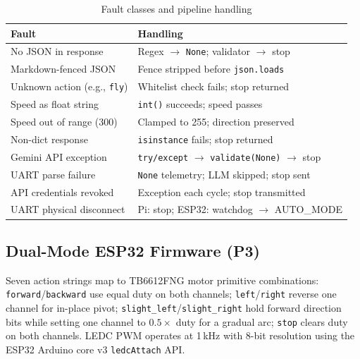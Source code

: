 \documentclass[conference]{IEEEtran}
\begin{document}
\begin{table}[t]
\caption{Fault classes and pipeline handling}
\label{tab:faults}
\centering
\renewcommand{\arraystretch}{1.05}
\begin{tabular}{@{}p{2.5cm}p{4.9cm}@{}}
\toprule
\textbf{Fault} & \textbf{Handling} \\
\midrule
No JSON in response       & Regex $\to$ \texttt{None}; validator $\to$ stop \\
Markdown-fenced JSON      & Fence stripped before \texttt{json.loads} \\
Unknown action (e.g., \texttt{fly}) & Whitelist check fails; stop returned \\
Speed as float string     & \texttt{int()} succeeds; speed passes \\
Speed out of range (300)  & Clamped to 255; direction preserved \\
Non-dict response         & \texttt{isinstance} fails; stop returned \\
Gemini API exception      & \texttt{try/except} $\to$ \texttt{validate(None)} $\to$ stop \\
UART parse failure        & \texttt{None} telemetry; LLM skipped; stop sent \\
API credentials revoked   & Exception each cycle; stop transmitted \\
UART physical disconnect  & Pi: stop; ESP32: watchdog $\to$ AUTO\_MODE \\
\bottomrule
\end{tabular}
\end{table}

\subsection{Dual-Mode ESP32 Firmware (P3)}
\label{sec:firmware}

Seven action strings map to TB6612FNG motor primitive combinations:
\texttt{forward}/\texttt{backward} use equal duty on both channels;
\texttt{left}/\texttt{right} reverse one channel for in-place pivot;
\texttt{slight\_left}/\texttt{slight\_right} hold forward direction bits
while setting one channel to $0.5\times$ duty for a gradual arc;
\texttt{stop} clears duty on both channels.
LEDC PWM operates at 1\,kHz with 8-bit resolution using the ESP32 Arduino
core v3 \texttt{ledcAttach} API.
\end{document}
